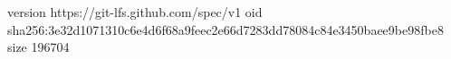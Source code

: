 version https://git-lfs.github.com/spec/v1
oid sha256:3e32d1071310c6e4d6f68a9feec2e66d7283dd78084c84e3450baee9be98fbe8
size 196704
